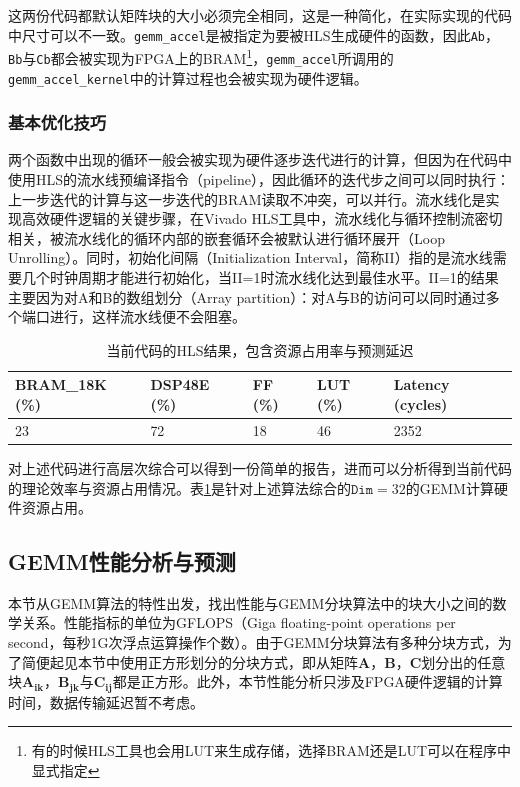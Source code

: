 这两份代码都默认矩阵块的大小必须完全相同，这是一种简化，在实际实现的代码中尺寸可以不一致。\texttt{gemm\_accel}是被指定为要被HLS生成硬件的函数，因此\texttt{Ab}，\texttt{Bb}与\texttt{Cb}都会被实现为FPGA上的BRAM\footnote{有的时候HLS工具也会用LUT来生成存储，选择BRAM还是LUT可以在程序中显式指定}，\texttt{gemm\_accel}所调用的\texttt{gemm\_accel\_kernel}中的计算过程也会被实现为硬件逻辑。

\subsubsection{基本优化技巧}
两个函数中出现的循环一般会被实现为硬件逐步迭代进行的计算，但因为在代码中使用HLS的流水线预编译指令（pipeline），因此循环的迭代步之间可以同时执行：上一步迭代的计算与这一步迭代的BRAM读取不冲突，可以并行。流水线化是实现高效硬件逻辑的关键步骤，在Vivado HLS工具中，流水线化与循环控制流密切相关，被流水线化的循环内部的嵌套循环会被默认进行循环展开（Loop Unrolling）。同时，初始化间隔（Initialization Interval，简称II）指的是流水线需要几个时钟周期才能进行初始化，当II=1时流水线化达到最佳水平。II=1的结果主要因为对A和B的数组划分（Array partition）：对A与B的访问可以同时通过多个端口进行，这样流水线便不会阻塞。

\begin{table}[!ht]
	\centering	
	\begin{tabular}{ | l | l | l | l | l |}
		\hline
		BRAM\_18K (\%) & DSP48E (\%) & FF (\%) & LUT (\%) & Latency (cycles) \\ \hline
		23 & 72 & 18 & 46 & 2352 \\ \hline
	\end{tabular}
	\caption{当前代码的HLS结果，包含资源占用率与预测延迟}
	\label{table:gemmorig}
\end{table}

对上述代码进行高层次综合可以得到一份简单的报告，进而可以分析得到当前代码的理论效率与资源占用情况。表\ref{table:gemmorig}是针对上述算法综合的$\mathtt{Dim}=32$的GEMM计算硬件资源占用。

\subsection{GEMM性能分析与预测}

本节从GEMM算法的特性出发，找出性能与GEMM分块算法中的块大小之间的数学关系。性能指标的单位为GFLOPS（Giga floating-point operations per second，每秒1G次浮点运算操作个数）。由于GEMM分块算法有多种分块方式，为了简便起见本节中使用正方形划分的分块方式，即从矩阵$\mathbf{A}$，$\mathbf{B}$，$\mathbf{C}$划分出的任意块$\mathbf{A_{ik}}$，$\mathbf{B_{jk}}$与$\mathbf{C_{ij}}$都是正方形。此外，本节性能分析只涉及FPGA硬件逻辑的计算时间，数据传输延迟暂不考虑。

